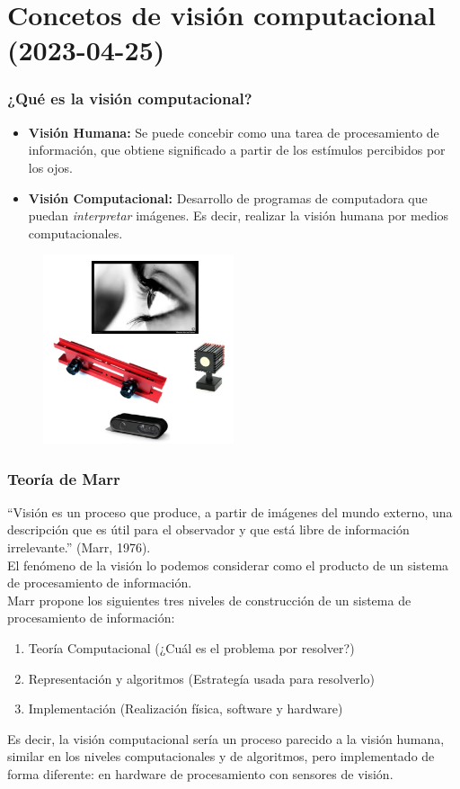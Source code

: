 \section{Concetos de visión computacional (2023-04-25)}


\begin{frame}\frametitle{¿Qué es la visión computacional?}
  \begin{itemize}
  \item \textbf{Visión Humana: } Se puede concebir como una tarea de procesamiento de información, que obtiene significado a partir de los estímulos percibidos por los ojos.
  \item \textbf{Visión Computacional: } Desarrollo de programas de computadora que puedan \textit{interpretar} imágenes. Es decir, realizar la visión humana por medios computacionales. 
  \end{itemize}
  \begin{figure}
    \centering
    \includegraphics[width=0.5\textwidth]{Figures/ComputerVision.png}
  \end{figure}
\end{frame}

\begin{frame}\frametitle{Teoría de Marr}
“Visión es un proceso que produce, a partir de imágenes del mundo externo, una descripción que es útil para el observador y que está libre de información irrelevante.” (Marr, 1976).\\
El fenómeno de la visión lo podemos considerar como el producto de un sistema de procesamiento de información.\\

Marr propone los siguientes tres niveles de construcción de un sistema de procesamiento de información:\\
\begin{enumerate}
\item Teoría Computacional (¿Cuál es el problema por resolver?)
\item Representación y algoritmos (Estrategía usada para resolverlo)
\item Implementación (Realización física, software y hardware)
\end{enumerate}
Es decir, la visión computacional sería un proceso parecido a la visión humana, similar en los niveles computacionales y de algoritmos, pero implementado de forma diferente: en hardware de procesamiento con sensores de visión. 
\end{frame}

